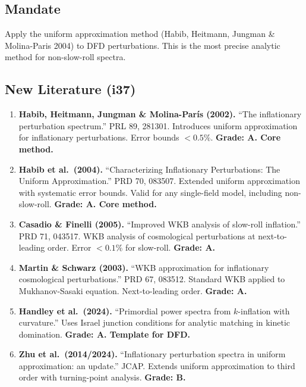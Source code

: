 \documentclass[11pt,a4paper]{article}
\begin{document}
\subsection{Mandate}

Apply the uniform approximation method (Habib, Heitmann, Jungman \& Molina-Paris 2004) to DFD perturbations. This is the most precise analytic method for non-slow-roll spectra.

\subsection{New Literature (i37)}

\begin{enumerate}
\item \textbf{Habib, Heitmann, Jungman \& Molina-Par\'is (2002).} ``The inflationary perturbation spectrum.'' PRL 89, 281301. Introduces uniform approximation for inflationary perturbations. Error bounds $< 0.5\%$. \textbf{Grade: A. Core method.}

\item \textbf{Habib et al.\ (2004).} ``Characterizing Inflationary Perturbations: The Uniform Approximation.'' PRD 70, 083507. Extended uniform approximation with systematic error bounds. Valid for any single-field model, including non-slow-roll. \textbf{Grade: A. Core method.}

\item \textbf{Casadio \& Finelli (2005).} ``Improved WKB analysis of slow-roll inflation.'' PRD 71, 043517. WKB analysis of cosmological perturbations at next-to-leading order. Error $< 0.1\%$ for slow-roll. \textbf{Grade: A.}

\item \textbf{Martin \& Schwarz (2003).} ``WKB approximation for inflationary cosmological perturbations.'' PRD 67, 083512. Standard WKB applied to Mukhanov-Sasaki equation. Next-to-leading order. \textbf{Grade: A.}

\item \textbf{Handley et al.\ (2024).} ``Primordial power spectra from $k$-inflation with curvature.'' Uses Israel junction conditions for analytic matching in kinetic domination. \textbf{Grade: A. Template for DFD.}

\item \textbf{Zhu et al.\ (2014/2024).} ``Inflationary perturbation spectra in uniform approximation: an update.'' JCAP. Extends uniform approximation to third order with turning-point analysis. \textbf{Grade: B.}
\end{enumerate}
\end{document}
